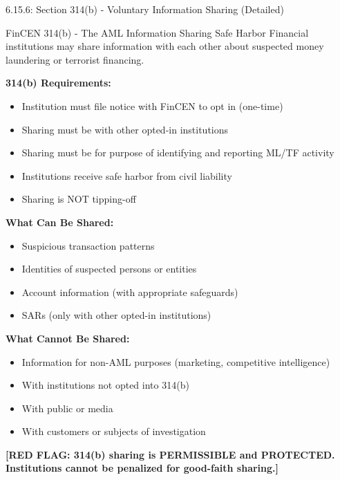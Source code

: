 \documentclass[11pt,a4paper]{beamer}
\newcommand{\redflag}[1]{\textcolor{red!80!black}{\textbf{[RED FLAG: #1]}}}
\begin{document}
\begin{frame}{6.15.6: Section 314(b) - Voluntary Information Sharing (Detailed)}
	\begin{block}{FinCEN 314(b) - The AML Information Sharing Safe Harbor}
		Financial institutions may share information with each other about suspected money laundering or terrorist financing.
	\end{block}
	\textbf{314(b) Requirements:}
	\begin{itemize}
		\item Institution must file notice with FinCEN to opt in (one-time)
		\item Sharing must be with other opted-in institutions
		\item Sharing must be for purpose of identifying and reporting ML/TF activity
		\item Institutions receive safe harbor from civil liability
		\item Sharing is NOT tipping-off
	\end{itemize}
	\textbf{What Can Be Shared:}
	\begin{itemize}
		\item Suspicious transaction patterns
		\item Identities of suspected persons or entities
		\item Account information (with appropriate safeguards)
		\item SARs (only with other opted-in institutions)
	\end{itemize}
	\textbf{What Cannot Be Shared:}
	\begin{itemize}
		\item Information for non-AML purposes (marketing, competitive intelligence)
		\item With institutions not opted into 314(b)
		\item With public or media
		\item With customers or subjects of investigation
	\end{itemize}
	\redflag{314(b) sharing is PERMISSIBLE and PROTECTED. Institutions cannot be penalized for good-faith sharing.}
\end{frame}
\end{document}
